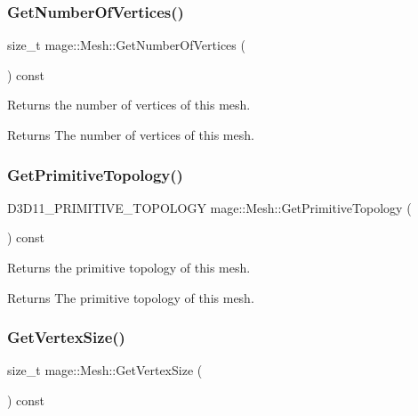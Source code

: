 \subsubsection{\texorpdfstring{Get\+Number\+Of\+Vertices()}{GetNumberOfVertices()}}
{\footnotesize\ttfamily size\+\_\+t mage\+::\+Mesh\+::\+Get\+Number\+Of\+Vertices (\begin{DoxyParamCaption}{ }\end{DoxyParamCaption}) const\hspace{0.3cm}{\ttfamily [noexcept]}}

Returns the number of vertices of this mesh.

\begin{DoxyReturn}{Returns}
The number of vertices of this mesh. 
\end{DoxyReturn}
\hypertarget{classmage_1_1_mesh_af64af13acf2f372515ffdc20ce45fcb4}{}\label{classmage_1_1_mesh_af64af13acf2f372515ffdc20ce45fcb4} 
\subsubsection{\texorpdfstring{Get\+Primitive\+Topology()}{GetPrimitiveTopology()}}
{\footnotesize\ttfamily D3\+D11\+\_\+\+P\+R\+I\+M\+I\+T\+I\+V\+E\+\_\+\+T\+O\+P\+O\+L\+O\+GY mage\+::\+Mesh\+::\+Get\+Primitive\+Topology (\begin{DoxyParamCaption}{ }\end{DoxyParamCaption}) const\hspace{0.3cm}{\ttfamily [noexcept]}}

Returns the primitive topology of this mesh.

\begin{DoxyReturn}{Returns}
The primitive topology of this mesh. 
\end{DoxyReturn}
\hypertarget{classmage_1_1_mesh_a01ea4c5a09ffc6b4babc26a4f85a673e}{}\label{classmage_1_1_mesh_a01ea4c5a09ffc6b4babc26a4f85a673e} 
\subsubsection{\texorpdfstring{Get\+Vertex\+Size()}{GetVertexSize()}}
{\footnotesize\ttfamily size\+\_\+t mage\+::\+Mesh\+::\+Get\+Vertex\+Size (\begin{DoxyParamCaption}{ }\end{DoxyParamCaption}) const\hspace{0.3cm}{\ttfamily [noexcept]}}

